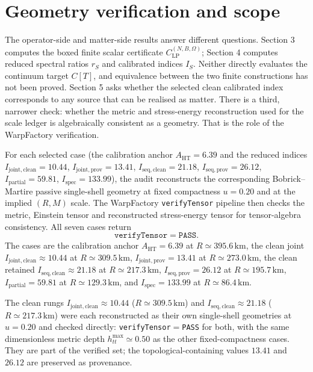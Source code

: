 \documentclass[11pt,a4paper]{article}
\begin{document}
\section{Geometry verification and scope}\label{sec:verification}

The operator-side and matter-side results answer different questions. Section 3 computes the boxed finite scalar certificate $C_{\mathrm{LP}}^{(N,B,\Omega)}$; Section 4 computes reduced spectral ratios $r_{S}$ and calibrated indices $I_{S}$. Neither directly evaluates the continuum target $C[T]$, and equivalence between the two finite constructions has not been proved. Section 5 asks whether the selected clean calibrated index corresponds to any source that can be realised as matter. There is a third, narrower check: whether the metric and stress-energy reconstruction used for the scale ledger is algebraically consistent as a geometry. That is the role of the WarpFactory verification.

For each selected case (the calibration anchor $A_{\mathrm{HT}}=6.39$ and the reduced indices $I_{\mathrm{joint,clean}}=10.44$, $I_{\mathrm{joint,prov}}=13.41$, $I_{\mathrm{seq,clean}}=21.18$, $I_{\mathrm{seq,prov}}=26.12$, $I_{\mathrm{partial}}=59.81$, $I_{\mathrm{spec}}=133.99$), the audit reconstructs the corresponding Bobrick--Martire passive single-shell geometry at fixed compactness $u=0.20$ and at the implied $(R,M)$ scale. The WarpFactory \texttt{verifyTensor} pipeline then checks the metric, Einstein tensor and reconstructed stress-energy tensor for tensor-algebra consistency. All seven cases return
\[
\texttt{verifyTensor}=\texttt{PASS}.
\]
The cases are the calibration anchor $A_{\mathrm{HT}}=6.39$ at $R\simeq395.6\,\mathrm{km}$, the clean joint $I_{\mathrm{joint,clean}}\approx10.44$ at $R\simeq309.5\,\mathrm{km}$, $I_{\mathrm{joint,prov}}=13.41$ at $R\simeq273.0\,\mathrm{km}$, the clean retained $I_{\mathrm{seq,clean}}\approx21.18$ at $R\simeq217.3\,\mathrm{km}$, $I_{\mathrm{seq,prov}}=26.12$ at $R\simeq195.7\,\mathrm{km}$, $I_{\mathrm{partial}}=59.81$ at $R\simeq129.3\,\mathrm{km}$, and $I_{\mathrm{spec}}=133.99$ at $R\simeq86.4\,\mathrm{km}$. \cite{WarpFactory2024,WarpFactoryCQG2024,WarpFactoryRepo}

The clean rungs $I_{\mathrm{joint,clean}}\approx10.44$ ($R\simeq309.5\,\mathrm{km}$) and $I_{\mathrm{seq,clean}}\approx21.18$ ($R\simeq217.3\,\mathrm{km}$) were each reconstructed as their own single-shell geometries at $u=0.20$ and checked directly: \texttt{verifyTensor}$=$\texttt{PASS} for both, with the same dimensionless metric depth $h_{tt}^{\max}\simeq0.50$ as the other fixed-compactness cases. They are part of the verified set; the topological-containing values $13.41$ and $26.12$ are preserved as provenance.
\end{document}
